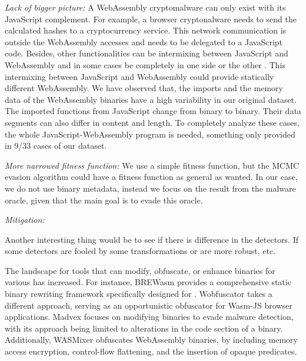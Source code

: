 \emph{Lack of bigger picture:} A WebAssembly cryptomalware can only exist with its JavaScript complement.
For example, a browser cryptonalware needs to send the calculated hashes to a cryptocurrency service.
This network communication is outside the WebAssembly accesses and needs to be delegated to a JavaScript code.
Besides, other functionalities can be intermixing between JavaScript and WebAssembly and in some cases be completely in one side or the other \cite{romano2022wobfuscator}.
This intermixing between JavaScript and WebAssembly could provide statically different WebAssembly. 
We have observed that, the imports and the memory data of the WebAssembly binaries have a high variability in our original dataset.
The imported functions from JavaScript change from binary to binary.
Their data segments can also differ in content and length.
To completely analyze these cases, the whole JavaScript-WebAssembly program is needed, something only provided in 9/33 cases of our dataset.

\emph{More narrowed fitness function:} We use a simple fitness function, but the MCMC evasion algorithm could have a fitness function as general as wanted.
In our case, we do not use binary metadata, instead we focus on the result from the malware oracle, given that the main goal is to evade this oracle.

\emph{Mitigation: } 


Another interesting thing would be to see if there is difference in the detectors. If some detectors are fooled by some transformations or are more robust, etc.


 The landscape for tools that can modify, obfuscate, or enhance \Wasm binaries for various has increased. 
For instance, BREWasm\cite{BREWasm} provides a comprehensive static binary rewriting framework specifically designed for \Wasm. 
Wobfuscator\cite{wobfuscator} takes a different approach, serving as an opportunistic obfuscator for Wasm-JS browser applications. 
Madvex\cite{madvex} focuses on modifying \Wasm binaries to evade malware detection, with its approach being limited to alterations in the code section of a \Wasm binary. 
Additionally, WASMixer\cite{wasmixer} obfuscates WebAssembly binaries, by including memory access encryption, control-flow flattening, and the insertion of opaque predicates.


